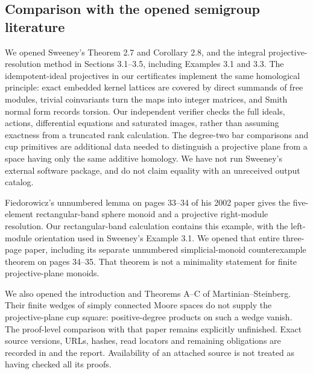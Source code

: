 \subsection{Comparison with the opened semigroup literature}
We opened Sweeney's Theorem 2.7 and Corollary 2.8, and the
integral projective-resolution method in Sections 3.1--3.5,
including Examples 3.1 and 3.3\cite{CP2-Sweeney2025}.
The idempotent-ideal projectives in our certificates implement
the same homological principle: exact embedded kernel lattices
are covered by direct summands of free modules, trivial
coinvariants turn the maps into integer matrices, and Smith
normal form records torsion. Our independent verifier checks
the full ideals, actions, differential equations and saturated
images, rather than assuming exactness from a truncated rank
calculation. The degree-two bar comparisons and cup primitives
are additional data needed to distinguish a projective plane
from a space having only the same additive homology. We have
not run Sweeney's external software package, and do not claim
equality with an unreceived output catalog.

Fiedorowicz's unnumbered lemma on pages 33--34 of his 2002
paper gives the five-element rectangular-band sphere monoid
and a projective right-module resolution\cite{CP2-Fiedorowicz2002}.
Our rectangular-band calculation contains this example, with
the left-module orientation used in Sweeney's Example 3.1.
We opened that entire three-page paper, including its separate
unnumbered simplicial-monoid counterexample theorem on pages
34--35. That theorem is not a minimality statement for finite
projective-plane monoids.

We also opened the introduction and Theorems A--C of
Martinian--Steinberg\cite{CP2-MartinianSteinberg2025}.
Their finite wedges of simply connected Moore spaces do not
supply the projective-plane cup square: positive-degree
products on such a wedge vanish. The proof-level comparison
with that paper remains explicitly unfinished. Exact source
versions, URLs, hashes, read locators and remaining obligations
are recorded in  and
the report. Availability of an attached source is not treated
as having checked all its proofs.
